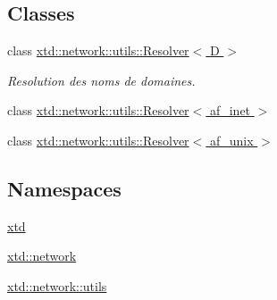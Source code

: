 \subsection*{Classes}
\begin{DoxyCompactItemize}
\item 
class \hyperlink{classxtd_1_1network_1_1utils_1_1Resolver}{xtd\-::network\-::utils\-::\-Resolver$<$ D $>$}
\begin{DoxyCompactList}\small\item\em Resolution des noms de domaines. \end{DoxyCompactList}\item 
class \hyperlink{classxtd_1_1network_1_1utils_1_1Resolver_3_01af__inet_01_4}{xtd\-::network\-::utils\-::\-Resolver$<$ af\-\_\-inet $>$}
\item 
class \hyperlink{classxtd_1_1network_1_1utils_1_1Resolver_3_01af__unix_01_4}{xtd\-::network\-::utils\-::\-Resolver$<$ af\-\_\-unix $>$}
\end{DoxyCompactItemize}
\subsection*{Namespaces}
\begin{DoxyCompactItemize}
\item 
\hyperlink{namespacextd}{xtd}
\item 
\hyperlink{namespacextd_1_1network}{xtd\-::network}
\item 
\hyperlink{namespacextd_1_1network_1_1utils}{xtd\-::network\-::utils}
\end{DoxyCompactItemize}
